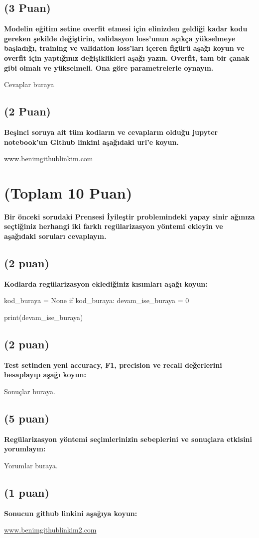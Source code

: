 \documentclass[11pt]{article}
\begin{document}
\subsection{(3 Puan)} \textbf{Modelin eğitim setine overfit etmesi için elinizden geldiği kadar kodu gereken şekilde değiştirin, validasyon loss'unun açıkça yükselmeye başladığı, training ve validation loss'ları içeren figürü aşağı koyun ve overfit için yaptığınız değişiklikleri aşağı yazın. Overfit, tam bir çanak gibi olmalı ve yükselmeli. Ona göre parametrelerle oynayın.}

Cevaplar buraya

\begin{comment}
\begin{figure}[ht!]
    \centering
    \texttt{[image: mypicturehere.png]}
    \caption{Buraya açıklama yazın}
    \label{fig:my_pic}
\end{figure}
\end{comment}

\subsection{(2 Puan)} \textbf{Beşinci soruya ait tüm kodların ve cevapların olduğu jupyter notebook'un Github linkini aşağıdaki url'e koyun.}

\url{www.benimgithublinkim.com}

\section{(Toplam 10 Puan)} \textbf{Bir önceki sorudaki Prensesi İyileştir problemindeki yapay sinir ağınıza seçtiğiniz herhangi iki farklı regülarizasyon yöntemi ekleyin ve aşağıdaki soruları cevaplayın.} 

\subsection{(2 puan)} \textbf{Kodlarda regülarizasyon eklediğiniz kısımları aşağı koyun:} 

\begin{python}
kod_buraya = None
if kod_buraya:
    devam_ise_buraya = 0

print(devam_ise_buraya)
\end{python}

\subsection{(2 puan)} \textbf{Test setinden yeni accuracy, F1, precision ve recall değerlerini hesaplayıp aşağı koyun:}

Sonuçlar buraya.

\subsection{(5 puan)} \textbf{Regülarizasyon yöntemi seçimlerinizin sebeplerini ve sonuçlara etkisini yorumlayın:}

Yorumlar buraya.

\subsection{(1 puan)} \textbf{Sonucun github linkini  aşağıya koyun:}

\url{www.benimgithublinkim2.com}
\end{document}
